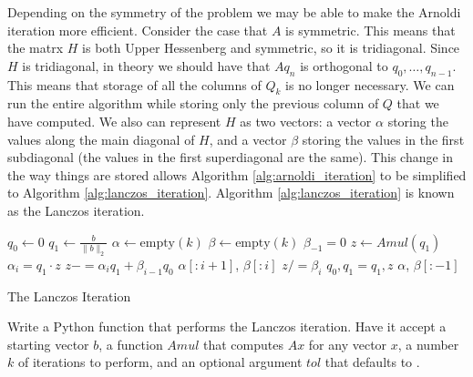 Depending on the symmetry of the problem we may be able to make the Arnoldi iteration more efficient.
Consider the case that $A$ is symmetric.
This means that the matrx $H$ is both Upper Hessenberg and symmetric, so it is tridiagonal.
Since $H$ is tridiagonal, in theory we should have that $A q_n$ is orthogonal to $q_0, \dots, q_{n-1}$.
This means that storage of all the columns of $Q_k$ is no longer necessary.
We can run the entire algorithm while storing only the previous column of $Q$ that we have computed.
We also can represent $H$ as two vectors: a vector $\alpha$ storing the values along the main diagonal of $H$, and a vector $\beta$ storing the values in the first subdiagonal (the values in the first superdiagonal are the same).
This change in the way things are stored allows Algorithm \ref{alg:arnoldi_iteration} to be simplified to Algorithm \ref{alg:lanczos_iteration}.
Algorithm \ref{alg:lanczos_iteration} is known as the Lanczos iteration.

\begin{algorithm}
\begin{algorithmic}[1]
	\State $q_0 \gets 0$								
	\State $q_1 \gets \frac{b}{\|b\|_2}$
	\State $\alpha \gets \text{empty}\left(k\right)$
	\State $\beta \gets \text{empty}\left(k\right)$
	\State $\beta_{-1} = 0$
										
		\State $z \gets Amul\left(q_1\right)$					
		\State $\alpha_i = q_1 \cdot z$						
		\State $z -= \alpha_i q_1 + \beta_{i-1} q_0$				
										
			\State {} $\alpha [: i+1]$, $\beta [: i]$
		\EndIf
		\State $z /= \beta_i$
		\State $q_0, q_1 = q_1, z$						
	\EndFor
	\State {} $\alpha$, $\beta [: -1]$
\EndProcedure
\end{algorithmic}
\caption{The Lanczos Iteration}
\label{alg:lanczos_iteration}
\end{algorithm}

\begin{problem}
\label{prob:lanczos}
Write a Python function that performs the Lanczos iteration.
Have it accept a starting vector $b$, a function $Amul$ that computes $A x$ for any vector $x$, a number $k$ of iterations to perform, and an optional argument $tol$ that defaults to .
\end{problem}

